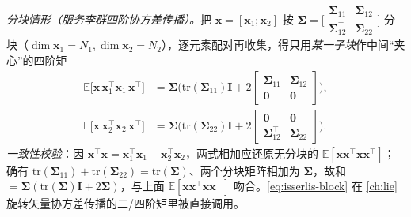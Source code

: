 \emph{分块情形（服务李群四阶协方差传播）。}\;把 $\mathbf{x}=[\mathbf{x}_1;\mathbf{x}_2]$ 按 $\boldsymbol{\Sigma}=\big[\begin{smallmatrix}\boldsymbol{\Sigma}_{11}&\boldsymbol{\Sigma}_{12}\\\boldsymbol{\Sigma}_{12}^\top&\boldsymbol{\Sigma}_{22}\end{smallmatrix}\big]$ 分块（$\dim\mathbf{x}_1=N_1,\dim\mathbf{x}_2=N_2$），逐元素配对再收集，得只用\emph{某一子块}作中间“夹心”的四阶矩
\begin{subequations}\label{eq:isserlis-block}
\begin{align}
  \mathbb{E}\big[\mathbf{x}\,\mathbf{x}_1^\top\mathbf{x}_1\,\mathbf{x}^\top\big]
  &=\boldsymbol{\Sigma}\Big(\mathrm{tr}(\boldsymbol{\Sigma}_{11})\mathbf{I}+2\begin{bmatrix}\boldsymbol{\Sigma}_{11}&\boldsymbol{\Sigma}_{12}\\\mathbf{0}&\mathbf{0}\end{bmatrix}\Big),\label{eq:isserlis-block-1}\\
  \mathbb{E}\big[\mathbf{x}\,\mathbf{x}_2^\top\mathbf{x}_2\,\mathbf{x}^\top\big]
  &=\boldsymbol{\Sigma}\Big(\mathrm{tr}(\boldsymbol{\Sigma}_{22})\mathbf{I}+2\begin{bmatrix}\mathbf{0}&\mathbf{0}\\\boldsymbol{\Sigma}_{12}^\top&\boldsymbol{\Sigma}_{22}\end{bmatrix}\Big).\label{eq:isserlis-block-2}
\end{align}
\end{subequations}
\emph{一致性校验}：因 $\mathbf{x}^\top\mathbf{x}=\mathbf{x}_1^\top\mathbf{x}_1+\mathbf{x}_2^\top\mathbf{x}_2$，两式相加应还原无分块的 $\mathbb{E}[\mathbf{x}\mathbf{x}^\top\mathbf{x}\mathbf{x}^\top]$；确有 $\mathrm{tr}(\boldsymbol{\Sigma}_{11})+\mathrm{tr}(\boldsymbol{\Sigma}_{22})=\mathrm{tr}(\boldsymbol{\Sigma})$、两个分块矩阵相加为 $\boldsymbol{\Sigma}$，故和 $=\boldsymbol{\Sigma}(\mathrm{tr}(\boldsymbol{\Sigma})\mathbf{I}+2\boldsymbol{\Sigma})$，与上面 $\mathbb{E}[\mathbf{x}\mathbf{x}^\top\mathbf{x}\mathbf{x}^\top]$ 吻合。\cref{eq:isserlis-block} 在 \cref{ch:lie} 旋转矢量协方差传播的二/四阶矩里被直接调用。


